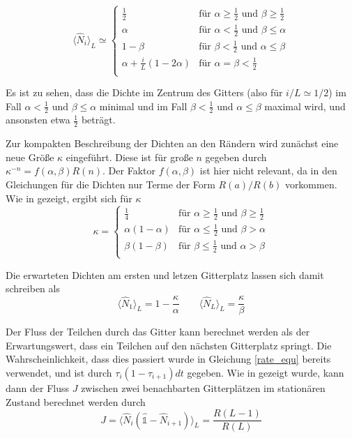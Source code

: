 \documentclass[10pt,a4paper]{report}
\begin{document}
\begin{equation}\label{density_equ}
\langle\hat{N}_i\rangle_L\simeq
\begin{cases}
\frac{1}{2}&\text{für }\alpha\geq\frac{1}{2}\text{ und }\beta\geq\frac{1}{2}\\
\alpha&\text{für }\alpha<\frac{1}{2}\text{ und }\beta\leq\alpha\\
1-\beta&\text{für }\beta<\frac{1}{2}\text{ und }\alpha\leq\beta\\
\alpha+\frac{i}{L}(1-2\alpha)&\text{für }\alpha=\beta<\frac{1}{2}\\
\end{cases}
\end{equation}

Es ist zu sehen, dass die Dichte im Zentrum des Gitters (also für $i/L\simeq 1/2$) im Fall $\alpha<\frac{1}{2}\text{ und }\beta\leq\alpha$ minimal und im Fall $\beta<\frac{1}{2}\text{ und }\alpha\leq\beta$ maximal wird, und ansonsten etwa $\frac{1}{2}$ beträgt.

Zur kompakten Beschreibung der Dichten an den Rändern wird zunächst eine neue Größe $\kappa$ eingeführt. Diese ist für große $n$ gegeben durch $\kappa^{-n}=f(\alpha,\beta)R(n)$. Der Faktor $f(\alpha,\beta)$ ist hier nicht relevant, da in den Gleichungen für die Dichten nur Terme der Form $R(a)/R(b)$ vorkommen. Wie in \cite{ASEP} gezeigt, ergibt sich für $\kappa$
\begin{equation}
\kappa=
\begin{cases}
\frac{1}{4}&\text{für }\alpha\geq\frac{1}{2}\text{ und }\beta\geq\frac{1}{2}\\
\alpha(1-\alpha)&\text{für }\alpha\leq\frac{1}{2}\text{ und }\beta>\alpha\\
\beta(1-\beta)&\text{für }\beta\leq\frac{1}{2}\text{ und }\alpha>\beta\\
\end{cases}
\end{equation}

Die erwarteten Dichten am ersten und letzen Gitterplatz lassen sich damit schreiben als
\begin{equation}
\langle\hat{N}_1\rangle_L=1-\frac{\kappa}{\alpha} \qquad \langle\hat{N}_L\rangle_L=\frac{\kappa}{\beta}
\end{equation}

Der Fluss der Teilchen durch das Gitter kann berechnet werden als der Erwartungswert, dass ein Teilchen auf den nächsten Gitterplatz springt. Die Wahrscheinlichkeit, dass dies passiert wurde in Gleichung \ref{rate_equ} bereits verwendet, und ist durch $\tau_i(1-\tau_{i+1})dt$ gegeben. Wie in \cite{ASEP} gezeigt wurde, kann dann der Fluss $J$ zwischen zwei benachbarten Gitterplätzen im stationären Zustand berechnet werden durch
\begin{equation}
J=\langle\hat{N}_i(\hat{\mathbb{1}}-\hat{N}_{i+1})\rangle_L=\frac{R(L-1)}{R(L)}
\end{equation}
\end{document}
